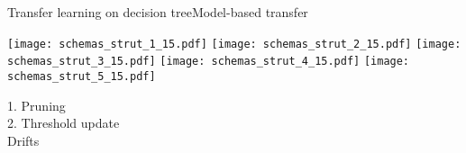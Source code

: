 \begin{frame}{Transfer learning on decision tree}{Model-based transfer}
\begin{minipage}[t]{0.49\linewidth}
    \renewcommand{\ratio}{0.65}
    \begin{overprint}
        \texttt{[image: schemas\_strut\_1\_15.pdf]}
        \texttt{[image: schemas\_strut\_2\_15.pdf]}
        \texttt{[image: schemas\_strut\_3\_15.pdf]}
        \texttt{[image: schemas\_strut\_4\_15.pdf]}
        \texttt{[image: schemas\_strut\_5\_15.pdf]}
    \end{overprint}

    \textcolor{myblue}{1. Pruning}\\
    \textcolor{myorange}{2. Threshold update}\\
    Drifts
\end{minipage}

\end{frame}

